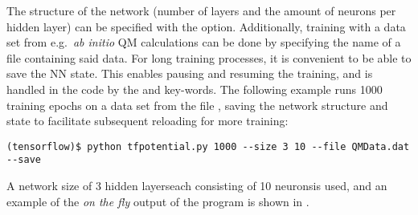 \documentclass[../../master.tex]{subfiles}
\begin{document}
The structure of the network (number of layers and the amount of neurons per hidden layer) can be specified with the  option. Additionally, training with a data set from e.g.\ \emph{ab initio} QM calculations can be done by specifying the name of a file containing said data. For long training processes, it is convenient to be able to save the NN state. This enables pausing and resuming the training, and is handled in the code by the  and  key-words. The following example runs 1000 training epochs on a data set from the file , saving the network structure and state to facilitate subsequent reloading for more training: 
\begin{lstlisting}
(tensorflow)$ python tfpotential.py 1000 --size 3 10 --file QMData.dat --save
\end{lstlisting}
A network size of 3 hidden layers\textemdash each consisting of 10 neurons\textemdash is used, and an example of the \emph{on the fly} output of the program is shown in .
\end{document}
